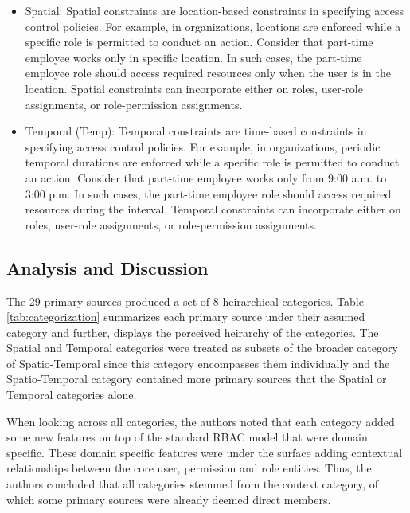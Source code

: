 \begin{itemize}
  \item Spatial:  Spatial constraints are location-based constraints in specifying access
	control policies. For example, in organizations, 	locations are enforced while a
	specific role is permitted to conduct an action. Consider that part-time employee works only in specific location.
	In such cases, the part-time employee role should access required resources only when the user is in the location. 
	Spatial constraints can incorporate either on roles, user-role assignments, or role-permission assignments. 

  \item Temporal (Temp):  Temporal constraints are time-based constraints in specifying access
	control policies. For example, in organizations, 	periodic temporal durations are enforced while a
	specific role is permitted to conduct an action. Consider that part-time employee works only from 9:00 a.m. to 3:00 p.m.
	In such cases, the part-time employee role should access required resources during the interval. 
	Temporal constraints can incorporate either on roles, user-role assignments, or role-permission assignments.   
	
\end{itemize}

\subsection{Analysis and Discussion}

The 29 primary sources produced a set of 8 heirarchical categories. Table \ref{tab:categorization} summarizes each primary source under their assumed
category and further, displays the perceived heirarchy of the categories. 
The Spatial and Temporal categories were treated as subsets of the broader category of Spatio-Temporal since this category encompasses them individually and
the Spatio-Temporal category contained more primary sources that the Spatial or Temporal categories alone.  

When looking across all categories, the authors noted that each category added some new features on top of the standard RBAC model that were domain specific.
These domain specific features were under the surface adding contextual relationships between the core user, permission and role entities.  Thus, the authors
concluded that all categories stemmed from the context category, of which some primary sources were already deemed direct members.  

